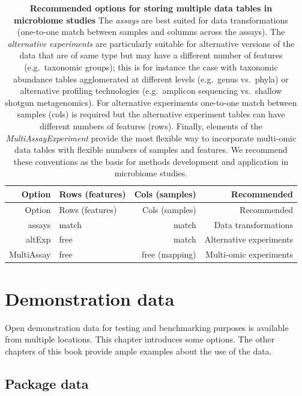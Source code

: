 \documentclass[
]{book}
\begin{document}
\begin{longtable}[]{@{}rlrr@{}}
\caption{\label{tab:options} \textbf{Recommended options for storing multiple data tables in microbiome studies} The \emph{assays} are best suited for data transformations (one-to-one match between samples and columns across the assays). The \emph{alternative experiments} are particularly suitable for alternative versions of the data that are of same type but may have a different number of features (e.g.~taxonomic groups); this is for instance the case with taxonomic abundance tables agglomerated at different levels (e.g.~genus vs.~phyla) or alternative profiling technologies (e.g.~amplicon sequencing vs.~shallow shotgun metagenomics). For alternative experiments one-to-one match between samples (cols) is required but the alternative experiment tables can have different numbers of features (rows). Finally, elements of the \emph{MultiAssayExperiment} provide the most flexible way to incorporate multi-omic data tables with flexible numbers of samples and features. We recommend these conventions as the basis for methods development and application in microbiome studies.}\tabularnewline
\toprule()
Option & Rows (features) & Cols (samples) & Recommended \\
\midrule()
\endfirsthead
\toprule()
Option & Rows (features) & Cols (samples) & Recommended \\
\midrule()
\endhead
assays & match & match & Data transformations \\
altExp & free & match & Alternative experiments \\
MultiAssay & free & free (mapping) & Multi-omic experiments \\
\bottomrule()
\end{longtable}

\hypertarget{example-data}{%
\section{Demonstration data}\label{example-data}}

Open demonstration data for testing and benchmarking purposes is
available from multiple locations. This chapter introduces some
options. The other chapters of this book provide ample examples about
the use of the data.

\hypertarget{package-data}{%
\subsection{Package data}\label{package-data}}
\end{document}
